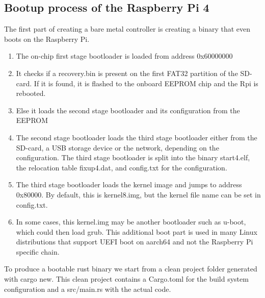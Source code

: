 \subsection{Bootup process of the Raspberry Pi 4}
\label{sec:concept_and_implementation:bare-metal:boot}

The first part of creating a bare metal controller is creating a binary that even boots on the Raspberry Pi.
\begin{enumerate}
    \item The on-chip first stage bootloader is loaded from address 0x60000000
    \item It checks if a recovery.bin is present on the first FAT32 partition of the SD-card. If it is found, it is flashed to the onboard EEPROM chip and the Rpi is rebooted.
    \item Else it loads the second stage bootloader and its configuration from the EEPROM
    \item The second stage bootloader loads the third stage bootloader either from the SD-card, a USB storage device or the network, depending on the configuration.
          The third stage bootloader is split into the binary start4.elf, the relocation table fixup4.dat, and config.txt for the configuration.
    \item The third stage bootloader loads the kernel image and jumps to address 0x80000. By default, this is kernel8.img, but the kernel file name can be set in config.txt.
    \item In some cases, this kernel.img may be another bootloader such as u-boot, which could then load grub.
          This additional boot part is used in many Linux distributions that support UEFI boot on aarch64 and not the Raspberry Pi specific chain.
\end{enumerate}

To produce a bootable rust binary we start from a clean project folder generated with cargo new.
This clean project contains a Cargo.toml for the build system configuration and a src/main.rs with the actual code.

